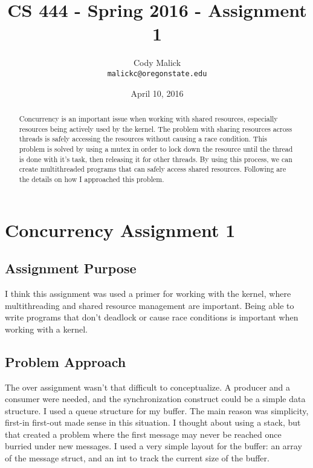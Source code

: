 \documentclass[10pt,letterpaper]{article}
\begin{document}
\begin{titlepage}
  \title{CS 444 - Spring 2016 - Assignment 1}
  \author{Cody Malick\\
  \texttt{malickc@oregonstate.edu}}
  \date{April 10, 2016}
  \maketitle
  \vspace*{2cm}
  \begin{abstract}
      \noindent Concurrency is an important issue when working with shared resources,
      especially resources being actively used by the kernel.
      The problem with sharing resources across threads is safely
      accessing the resources without causing a race condition. This problem is
      solved by using a mutex in order to lock down the resource until the thread
      is done with it's task, then releasing it for other threads. By using this
      process, we can create multithreaded programs that can safely access shared
      resources. Following are the details on how I approached this problem.
  \end{abstract}

\end{titlepage}

\tableofcontents
\clearpage

\section{Concurrency Assignment 1}
  \subsection{Assignment Purpose}
    I think this assignment was used a primer for working with the kernel, where
    multithreading and shared resource management are important. Being able to
    write programs that don't deadlock or cause race conditions is important
    when working with a kernel.
  \subsection{Problem Approach}
    The over assignment wasn't that difficult to conceptualize. A producer and
    a consumer were needed, and the synchronization construct could be a simple
    data structure.
    \noindent I used a queue structure for my buffer. The main reason was
    simplicity, first-in first-out made sense in this situation. I thought about
    using a stack, but that created a problem where the first message may never
    be reached once burried under new messages.
    \noindent I used a very simple layout for the buffer: an array of the message
    struct, and an int to track the current size of the buffer.
\end{document}
